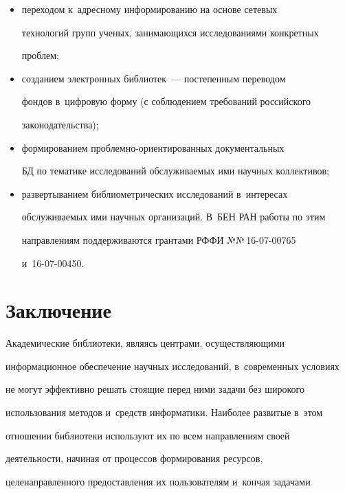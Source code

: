   \begin{itemize}


  \item[(а)] переходом к~адресному информированию на основе сетевых 


технологий групп ученых, занимающихся исследованиями конкретных 


проблем; 


  \item[(б)] созданием электронных библиотек~--- постепенным переводом 


фондов в~циф\-ро\-вую форму (с соблюдением требований российского 


законодательства);


  \item[(в)] формированием проблемно-ориентированных документальных 


БД по тематике исследований обслуживаемых ими научных коллективов;


  \item[(г)] развертыванием библиометрических исследований в~интересах 


обслу\-жи\-ва\-емых ими научных организаций. В~БЕН РАН работы по этим 


направлениям поддерживаются грантами РФФИ №№\,16-07-00765  


и~16-07-00450.


  \end{itemize}


  


\section{Заключение}





  Академические библиотеки, являясь центрами, осуществляющими 


информационное обеспечение научных исследований, в~современных условиях 


не могут эффективно решать стоящие перед ними задачи без широкого 


использования методов и~средств информатики. Наиболее развитые в~этом 


отношении библиотеки используют их по всем направлениям своей 


деятельности, начиная от процессов формирования ресурсов, 


целенаправленного предоставления их пользователям и~кончая задачами 


